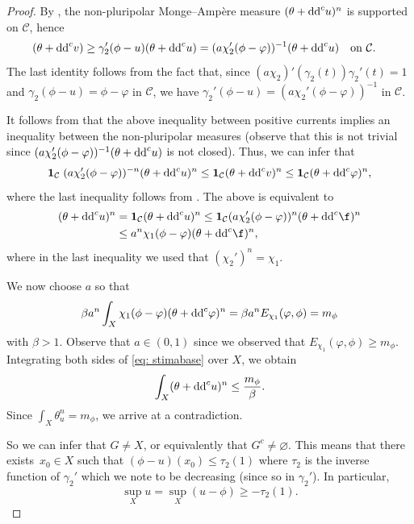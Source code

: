 \begin{proof}
By \cite[Theorem 2.7]{DDL6}, the non-pluripolar Monge--Amp\`ere measure $(\theta+{\rm dd}^c u)^n$ is supported on $\mathcal{C}$, hence
\begin{align*}%
	(\theta+{\rm dd}^c v) &\geq \gamma_2'(\phi-u) (\theta+{\rm dd}^c u)
		 = (a\chi_2'(\phi-\varphi))^{-1} (\theta+{\rm dd}^c u)\quad \text{on $\mathcal{C}$}.
\end{align*}
The last identity follows from the fact that, since $(a\chi_2)'(\gamma_2(t))\gamma_2'(t)=1$ and $\gamma_2(\phi-u)=\phi-\varphi$ in $\mathcal{C}$, we have $\gamma_2'(\phi-u)= (a\chi_2'(\phi-\varphi))^{-1}$ in $\mathcal{C}$.

It follows from \cite[Lemma 5.19]{DDL6} that the above inequality between positive currents implies an inequality between the non-pluripolar measures (observe that this is not trivial since $(a\chi_2'(\phi-\varphi))^{-1} (\theta+{\rm dd}^c u)$ is not closed).
Thus, we can infer that
\begin{equation*}
 {\bf 1}_{\mathcal{C}} \;(a\chi_2'(\phi-\varphi))^{-n} (\theta+{\rm dd}^c u)^n
	\leq {\bf 1}_{\mathcal{C}}(\theta+{\rm dd}^c v)^n \leq {\bf 1}_{\mathcal{C}}(\theta+{\rm dd}^c \varphi)^n,
\end{equation*}
where the last inequality follows from \cite[Lemma 4.5]{DDL5}. The above is equivalent to
\begin{align}
 (\theta+{\rm dd}^c u)^n &={\bf 1}_{ \mathcal{C}} (\theta+{\rm dd}^c u)^n \leq {\bf 1}_{ \mathcal{C}} (a\chi_2'(\phi-\varphi))^{n}(\theta+{\rm dd}^c \f)^n\nonumber\\
 &\leq a^n \chi_1(\phi-\varphi)(\theta+{\rm dd}^c \f)^n, \label{eq: stimabase}
\end{align}
where in the last inequality we used that $(\chi_2')^n=\chi_1$.

We now choose $a$ so that
\[
\beta a^n \int_X \chi_1(\phi-\varphi) (\theta+{\rm dd}^c \varphi)^n=\beta a^n E_{\chi_1}(\varphi, \phi) = m_\phi
\]
 with $\beta > 1$.
Observe that $a\in(0,1)$ since we observed that $E_{\chi_1}(\varphi, \phi)\geq m_\phi$.
Integrating both sides of \eqref{eq: stimabase} over $X$, we obtain
\[
\int_X (\theta+{\rm dd}^c u)^n \leq \frac{m_\phi}{\beta}.
\]
Since $\int_X \theta_u^n=m_\phi$, we arrive at a contradiction.

So we can infer that $G\neq X$, or equivalently that $G^c\neq \varnothing$. This means that there exists~${x_0\in X}$ such that $(\phi-u)(x_0)\leq \tau_2(1)$ where $\tau_2$ is the inverse function of $\gamma_2'$ which we note to be decreasing (since so in $\gamma_2'$). In particular,
\[\sup_X u =\sup_X (u-\phi) \geq -\tau_2(1).\]


\end{proof}
